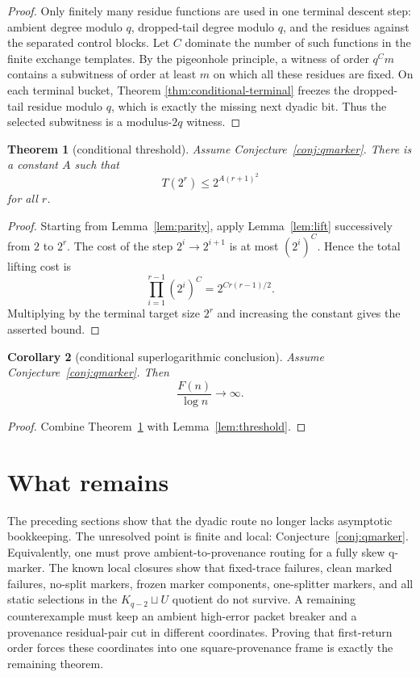 \documentclass[11pt]{article}
\newtheorem{theorem}{Theorem}[section]
\newtheorem{corollary}[theorem]{Corollary}
\theoremstyle{remark}
\begin{document}
\begin{proof}
Only finitely many residue functions are used in one terminal descent step:
ambient degree modulo \(q\), dropped-tail degree modulo \(q\), and the residues
against the separated control blocks.  Let \(C\) dominate the number of such
functions in the finite exchange templates.  By the pigeonhole principle, a
witness of order \(q^C m\) contains a subwitness of order at least \(m\) on
which all these residues are fixed.  On each terminal bucket, Theorem
\ref{thm:conditional-terminal} freezes the dropped-tail residue modulo \(q\),
which is exactly the missing next dyadic bit.  Thus the selected subwitness is
a modulus-\(2q\) witness.
\end{proof}

\begin{theorem}[conditional threshold]\label{thm:conditional-threshold}
Assume Conjecture~\ref{conj:qmarker}.  There is a constant \(A\) such that
\[
  T(2^r)\le 2^{A(r+1)^2}
\]
for all \(r\).
\end{theorem}

\begin{proof}
Starting from Lemma~\ref{lem:parity}, apply Lemma~\ref{lem:lift} successively
from \(2\) to \(2^r\).  The cost of the step \(2^i\to2^{i+1}\) is at most
\((2^i)^C\).  Hence the total lifting cost is
\[
  \prod_{i=1}^{r-1}(2^i)^C=2^{C r(r-1)/2}.
\]
Multiplying by the terminal target size \(2^r\) and increasing the constant
gives the asserted bound.
\end{proof}

\begin{corollary}[conditional superlogarithmic conclusion]
Assume Conjecture~\ref{conj:qmarker}.  Then
\[
  \frac{F(n)}{\log n}\to\infty .
\]
\end{corollary}

\begin{proof}
Combine Theorem~\ref{thm:conditional-threshold} with
Lemma~\ref{lem:threshold}.
\end{proof}

\section{What remains}

The preceding sections show that the dyadic route no longer lacks asymptotic
bookkeeping.  The unresolved point is finite and local:
Conjecture~\ref{conj:qmarker}.  Equivalently, one must prove
ambient-to-provenance routing for a fully skew q-marker.  The known local
closures show that fixed-trace failures, clean marked failures, no-split
markers, frozen marker components, one-splitter markers, and all static
selections in the \(K_{q-2}\sqcup U\) quotient do not survive.  A remaining
counterexample must keep an ambient high-error packet breaker and a provenance
residual-pair cut in different coordinates.  Proving that first-return order
forces these coordinates into one square-provenance frame is exactly the
remaining theorem.
\end{document}
